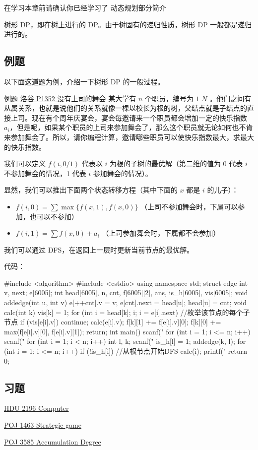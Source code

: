 
在学习本章前请确认你已经学习了 动态规划部分简介 

树形 DP，即在树上进行的 DP。由于树固有的递归性质，树形 DP 一般都是递归进行的。

\subsection{例题}

以下面这道题为例，介绍一下树形 DP 的一般过程。

\begin{NOTE}{例题 \href{https://www.luogu.org/problemnew/show/P1352}{洛谷 P1352 没有上司的舞会}}{}
某大学有 $n$ 个职员，编号为 $1\text{~} N$ 。他们之间有从属关系，也就是说他们的关系就像一棵以校长为根的树，父结点就是子结点的直接上司。现在有个周年庆宴会，宴会每邀请来一个职员都会增加一定的快乐指数 $a_i$，但是呢，如果某个职员的上司来参加舞会了，那么这个职员就无论如何也不肯来参加舞会了。所以，请你编程计算，邀请哪些职员可以使快乐指数最大，求最大的快乐指数。

\end{NOTE}


我们可以定义 $f(i,0/1)$ 代表以 $i$ 为根的子树的最优解（第二维的值为 0 代表 $i$ 不参加舞会的情况，1 代表 $i$ 参加舞会的情况）。

显然，我们可以推出下面两个状态转移方程（其中下面的 $x$ 都是 $i$ 的儿子）：

\begin{itemize}
\item $f(i,0) = \sum\max \{f(x,1),f(x,0)\}$ （上司不参加舞会时，下属可以参加，也可以不参加）
\item $f(i,1) = \sum{f(x,0)} + a_i$ （上司参加舞会时，下属都不会参加）
\end{itemize}

我们可以通过 DFS，在返回上一层时更新当前节点的最优解。

代码：

\begin{cppcode}
#include <algorithm>
#include <cstdio>
using namespace std;
struct edge {
  int v, next;
} e[6005];
int head[6005], n, cnt, f[6005][2], ans, is_h[6005], vis[6005];
void addedge(int u, int v) {
  e[++cnt].v = v;
  e[cnt].next = head[u];
  head[u] = cnt;
}
void calc(int k) {
  vis[k] = 1;
  for (int i = head[k]; i; i = e[i].next)  //枚举该节点的每个子节点
  {
    if (vis[e[i].v]) continue;
    calc(e[i].v);
    f[k][1] += f[e[i].v][0];
    f[k][0] += max(f[e[i].v][0], f[e[i].v][1]);
  }
  return;
}
int main() {
  scanf("%
  for (int i = 1; i <= n; i++) scanf("%
  for (int i = 1; i < n; i++) {
    int l, k;
    scanf("%
    is_h[l] = 1;
    addedge(k, l);
  }
  for (int i = 1; i <= n; i++)
    if (!is_h[i])  //从根节点开始DFS
    {
      calc(i);
      printf("%
      return 0;
    }
}
\end{cppcode}

\subsection{习题}

\href{http://acm.hdu.edu.cn/showproblem.php?pid=2196}{HDU 2196 Computer}

\href{http://poj.org/problem?id=1463}{POJ 1463 Strategic game}

\href{http://poj.org/problem?id=3585}{POJ 3585 Accumulation Degree}
